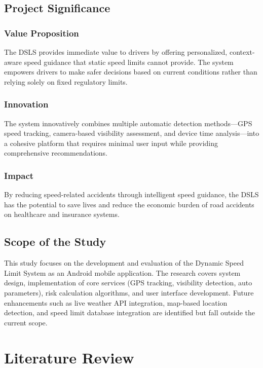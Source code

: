 \section{Project Significance}
\subsection{Value Proposition}
The DSLS provides immediate value to drivers by offering personalized, context-aware speed guidance that static speed limits cannot provide. The system empowers drivers to make safer decisions based on current conditions rather than relying solely on fixed regulatory limits.

\subsection{Innovation}
The system innovatively combines multiple automatic detection methods—GPS speed tracking, camera-based visibility assessment, and device time analysis—into a cohesive platform that requires minimal user input while providing comprehensive recommendations.

\subsection{Impact}
By reducing speed-related accidents through intelligent speed guidance, the DSLS has the potential to save lives and reduce the economic burden of road accidents on healthcare and insurance systems.

\section{Scope of the Study}
This study focuses on the development and evaluation of the Dynamic Speed Limit System as an Android mobile application. The research covers system design, implementation of core services (GPS tracking, visibility detection, auto parameters), risk calculation algorithms, and user interface development. Future enhancements such as live weather API integration, map-based location detection, and speed limit database integration are identified but fall outside the current scope.

\chapter{Literature Review}\label{chapter:Literature_Review}
